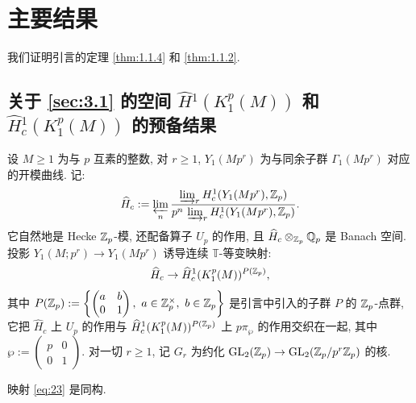 
\section{主要结果}

我们证明引言的定理 \ref{thm:1.1.4} 和 \ref{thm:1.1.2}.

\subsection{关于 \ref{sec:3.1} 的空间 $\widehat{H}{}^{1}(K_1^{p}(M))$ 和 $\widehat{H}{}_{c}^{1}(K_1^{p}(M))$ 的预备结果}

设 $M \ge 1$ 为与 $p$ 互素的整数, 对 $r \ge 1$, $Y_1(Mp^{r})$ 为与同余子群 $\Gamma_1(Mp^{r})$ 对应的开模曲线.
记:
\[
\widehat{H}_c := \varprojlim_n \frac{\varinjlim_r H_{c}^{1}(Y_1(Mp^{r}),\mathbb{Z}_p)}{p^{n}\,\varinjlim_r H_{c}^{1}(Y_1(Mp^{r}),\mathbb{Z}_p)}.
\]
它自然地是 Hecke $\mathbb{Z}_p$-模, 还配备算子 $U_p$ 的作用, 且 $\widehat{H}_c \otimes_{\mathbb{Z}_p} \mathbb{Q}_p$ 是 Banach 空间.
投影 $Y_1(M;p^{r}) \to Y_1(Mp^{r})$ 诱导连续 $\mathbb{T}$-等变映射:
\begin{equation}
\label{eq:23}
\widehat{H}_c \to \widehat{H}_{c}^{1}(K_1^{p}(M))^{P(\mathbb{Z}_p)},
\end{equation}
其中 $P(\mathbb{Z}_p) := \left\{\begin{pmatrix} a & b \\ 0 & 1 \end{pmatrix},\ a \in \mathbb{Z}_p^{\times},\ b \in \mathbb{Z}_p\right\}$ 是引言中引入的子群 $P$ 的 $\mathbb{Z}_p$-点群, 它把 $\widehat{H}_c$ 上 $U_p$ 的作用与 $\widehat{H}_{c}^{1}(K_1^{p}(M))^{P(\mathbb{Z}_p)}$ 上 $p\pi_{\wp}$ 的作用交织在一起, 其中 $\wp := \begin{pmatrix} p & 0 \\ 0 & 1 \end{pmatrix}$.
对一切 $r \ge 1$, 记 $G_r$ 为约化 $\mathrm{GL}_2(\mathbb{Z}_p) \to \mathrm{GL}_2(\mathbb{Z}_p/p^{r}\mathbb{Z}_p)$ 的核.

\begin{proposition}\label{prop:5.1.1}
映射 \eqref{eq:23} 是同构.
\end{proposition}

